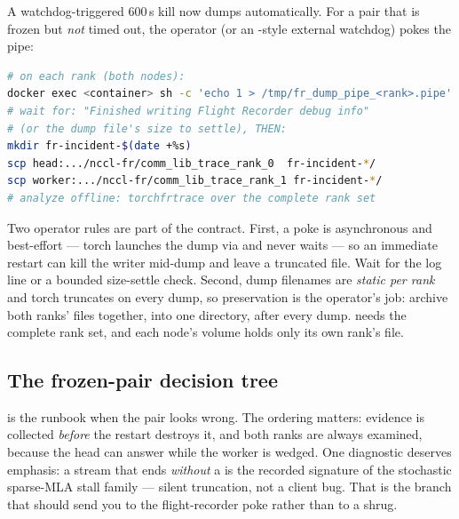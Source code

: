 A watchdog-triggered 600\,s kill now dumps automatically. For a pair that is
frozen but \emph{not} timed out, the operator (or an -style
external watchdog) pokes the pipe:

\begin{lstlisting}[language=bash]
# on each rank (both nodes):
docker exec <container> sh -c 'echo 1 > /tmp/fr_dump_pipe_<rank>.pipe'
# wait for: "Finished writing Flight Recorder debug info"
# (or the dump file's size to settle), THEN:
mkdir fr-incident-$(date +%s)
scp head:.../nccl-fr/comm_lib_trace_rank_0  fr-incident-*/
scp worker:.../nccl-fr/comm_lib_trace_rank_1 fr-incident-*/
# analyze offline: torchfrtrace over the complete rank set
\end{lstlisting}

Two operator rules are part of the contract. First, a poke is asynchronous and
best-effort --- torch launches the dump via  and never
waits --- so an immediate restart can kill the writer mid-dump and leave a
truncated file. Wait for the log line or a bounded size-settle check. Second,
dump filenames are \emph{static per rank} and torch truncates on every dump,
so preservation is the operator's job: archive both ranks'
 files together, into one directory, after every
dump.  needs the complete rank set, and each node's
volume holds only its own rank's file.

\subsection{The frozen-pair decision tree}

 is the runbook when the pair looks wrong. The
ordering matters: evidence is collected \emph{before} the restart destroys it,
and both ranks are always examined, because the head can answer
 while the worker is wedged. One diagnostic deserves emphasis: a
stream that ends \emph{without} a  is the recorded
signature of the  stochastic sparse-MLA stall family --- silent
truncation, not a client bug. That is the branch that should send you to
the flight-recorder poke rather than to a shrug.

